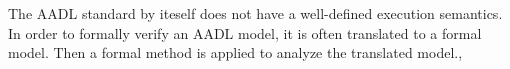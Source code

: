 The AADL standard by iteself does not have a well-defined execution semantics. In order to formally verify an AADL model, it is often translated to a formal model. Then a formal method is applied to analyze the translated model.\cite{AADL2TASM}, \cite{AADL2TLA} \cite{AADS} \cite{AADL2BIP}
